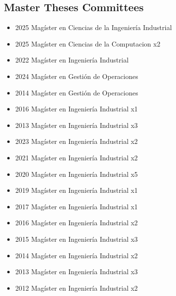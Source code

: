 \clearpage

\subsection{Master Theses Committees}


{\begin{itemize}
    \item 2025 Mag\'ister en Ciencias de la Ingenier\'ia Industrial
\end{itemize}
}

{\begin{itemize}
    \item 2025 Mag\'ister en Ciencias de la Computacion x2
    \item 2022 Mag\'ister en Ingenier\'ia Industrial
\end{itemize}
}

{\begin{itemize}
    \item 2024 Mag\'ister en Gesti\'on de Operaciones
    \item 2014 Mag\'ister en Gesti\'on de Operaciones
\end{itemize}
}

{\begin{itemize}
    \item 2016 Mag\'ister en Ingenier\'ia Industrial x1
    \item 2013 Mag\'ister en Ingenier\'ia Industrial x3
\end{itemize}
}

{\begin{itemize}
    \item 2023 Mag\'ister en Ingenier\'ia Industrial x2
    \item 2021 Mag\'ister en Ingenier\'ia Industrial x2
    \item 2020 Mag\'ister en Ingenier\'ia Industrial x5
    \item 2019 Mag\'ister en Ingenier\'ia Industrial x1
    \item 2017 Mag\'ister en Ingenier\'ia Industrial x1
    \item 2016 Mag\'ister en Ingenier\'ia Industrial x2
    \item 2015 Mag\'ister en Ingenier\'ia Industrial x3
    \item 2014 Mag\'ister en Ingenier\'ia Industrial x2
    \item 2013 Mag\'ister en Ingenier\'ia Industrial x3
    \item 2012 Mag\'ister en Ingenier\'ia Industrial x2
\end{itemize}
}

